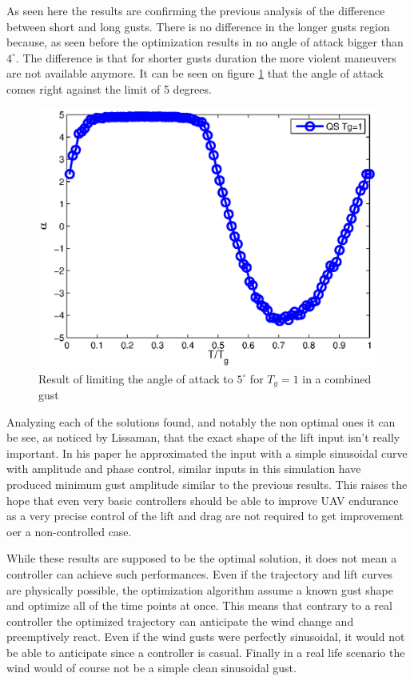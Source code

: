 \FloatBarrier

As seen here the results are confirming the previous analysis of the difference between short and long gusts.
There is no difference in the longer gusts region because, as seen before the optimization results in no angle of attack bigger than $4^{\circ}$.
The difference is that for shorter gusts duration the more violent maneuvers are not available anymore.
It can be seen on figure \ref{fig:alpha_vs_tg_maxalpha=5} that the angle of attack comes right against the limit of 5 degrees.

\begin{figure}[h]
  \centering
  \includegraphics{./Figures/alpha_vs_tg_Tg=1_wt3_maxalpha=5.eps}
  \caption{Result of limiting the angle of attack to $5^{\circ}$ for $T_g=1$ in a combined gust}
  \label{fig:alpha_vs_tg_maxalpha=5}
\end{figure}

\FloatBarrier
{}
Analyzing each of the solutions found, and notably the non optimal ones it can be see, as noticed by Lissaman, that the exact shape of the lift input isn't really important.
In his paper he approximated the input with a simple sinusoidal curve with amplitude and phase control, similar inputs in this simulation have produced minimum gust amplitude similar to the previous results.
This raises the hope that even very basic controllers should be able to improve UAV endurance as a very precise control of the lift and drag are not required to get improvement oer a non-controlled case.

\par While these results are supposed to be the optimal solution, it does not mean a controller can achieve such performances.
Even if the trajectory and lift curves are physically possible, the optimization algorithm assume a known gust shape and optimize all of the time points at once.
This means that contrary to a real controller the optimized trajectory can anticipate the wind change and preemptively react.
Even if the wind gusts were perfectly sinusoidal, it would not be able to anticipate since a controller is casual.
Finally in a real life scenario the wind would of course not be a simple clean sinusoidal gust.

